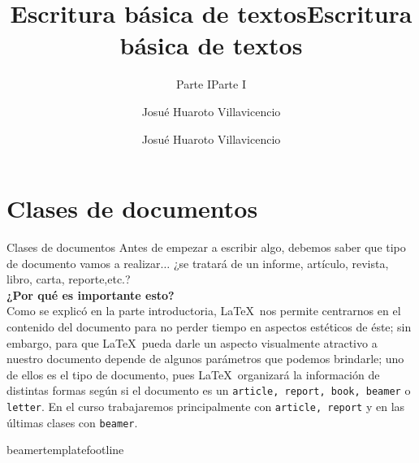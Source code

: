 \documentclass[10pt]{beamer}
\title{Escritura básica de textos}
\subtitle{Parte I}
\author[HeNeos]{Josué Huaroto Villavicencio}
\begin{document}
\begin{frame}
\maketitle
\end{frame}
\section{Clases de documentos}
\begin{frame}{Clases de documentos}
Antes de empezar a escribir algo, debemos saber que tipo de documento vamos a realizar$\ldots$ ¿se tratará de un informe, artículo, revista, libro, carta, reporte,etc.?\\[20pt]
\textbf{\large ¿Por qué es importante esto?}\\[6pt]
Como se explicó en la parte introductoria, \LaTeX \, nos permite centrarnos en el contenido del documento para no perder tiempo en aspectos estéticos de éste; sin embargo, para que \LaTeX \, pueda darle un aspecto visualmente atractivo a nuestro documento depende de algunos parámetros que podemos brindarle; uno de ellos es el tipo de documento, pues \LaTeX \, organizará la información de distintas formas según si el documento es un \texttt{article, report, book, beamer} o \texttt{letter}. En el curso trabajaremos principalmente con \texttt{article, report} y en las últimas clases con \texttt{beamer}.
\end{frame}beamertemplate{footline}{}
\title{Escritura básica de textos}
\subtitle{Parte I}
\author[HeNeos]{Josué Huaroto Villavicencio}
\end{document}
